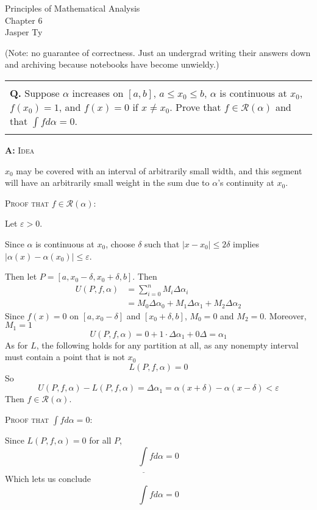 \documentclass{article}
\newenvironment{myboxed}{\noindent\begin{tabular}{|p{.975\linewidth}|}\hline \\}{\\\\\hline\end{tabular}}
\newenvironment{mytitle}{\noindent\large\begin{flushright}}{\end{flushright}\normalsize}
\newcounter{Question}
\newenvironment{Question} 
{\bigskip\begin{myboxed}\refstepcounter{Question}\par\noindent\textbf{Q\theQuestion.}}
{\end{myboxed}\bigskip}
\newenvironment{Answer} {\par\noindent\textbf{A:}} {}
\begin{document}
\begin{mytitle}
    Principles of Mathematical Analysis \\
    Chapter 6 \\
    \normalsize Jasper Ty
\end{mytitle}

\noindent
\footnotesize 
(Note: no guarantee of correctness. Just an undergrad writing their answers down and archiving because notebooks have become unwieldy.)
\normalsize


\begin{Question}
    Suppose $\alpha$ increases on $[a, b]$, $a \leq x_0 \leq b$, $\alpha$ is continuous at $x_0$, $f(x_0) = 1$, and $f(x) = 0$ if $x \neq x_0$. Prove that $f \in \mathscr{R}(\alpha)$ and that $\int f d\alpha = 0$.
\end{Question}
\begin{Answer}
    \textsc{Idea}

    $x_0$ may be covered with an interval of arbitrarily small width, and this segment will have an arbitrarily small weight in the sum due to $\alpha$'s continuity at $x_0$.

    \textsc{Proof that $f \in \mathscr{R}(\alpha)$:}

    Let $\varepsilon > 0$.

    Since $\alpha$ is continuous at $x_0$, choose $\delta$ such that $|x-x_0| \leq 2\delta$ implies $|\alpha(x) - \alpha(x_0)| \leq \varepsilon$. 

    Then let $P = [a, x_0-\delta, x_0 + \delta, b]$. Then
    \begin{align*}
        U(P,f,\alpha) &= \sum_{i=0}^n M_i \Delta\alpha_i \\
        &= M_0 \Delta\alpha_0 + M_1 \Delta\alpha_1 + M_2 \Delta\alpha_2 
    \end{align*}
    Since $f(x) = 0$ on $[a, x_0 - \delta]$ and $[x_0 + \delta, b]$, $M_0 = 0$ and $M_2 = 0$. Moreover, $M_1 = 1$ 
    \[U(P,f,\alpha) = 0 + 1 \cdot \Delta\alpha_1 + 0 \Delta = \alpha_1\]
    As for $L$, the following holds for any partition at all, as any nonempty interval must contain a point that is not $x_0$
    \[L(P,f,\alpha) = 0\]
    So
    \[
        U(P,f,\alpha) - L(P, f, \alpha) = \Delta\alpha_1
        = \alpha(x+\delta) - \alpha(x-\delta) < \varepsilon\]
    Then $f \in \mathscr{R}(\alpha)$.

    \textsc{Proof that $\int fd\alpha = 0$:}

    Since $L(P,f,\alpha) = 0$ for all $P$, 
    \[\underline{\int}fd\alpha = 0\]
    Which lets us conclude 
    \[\int fd\alpha = 0\]
\end{Answer}
\end{document}
